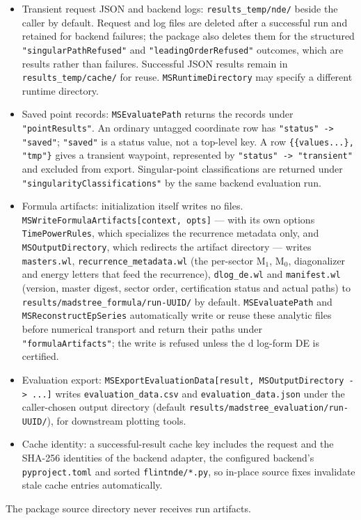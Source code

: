 \documentclass[11pt,a4paper]{article}
\numberwithin{table}{section}
\begin{document}
\begin{itemize}
  \item Transient request JSON and backend logs:
        \texttt{results\_temp/\allowbreak nde/} beside the caller by default.
        Request and log files are deleted after a successful run and retained for backend
        failures; the package also deletes them for the structured \texttt{"singularPathRefused"}
        and \texttt{"leadingOrderRefused"} outcomes, which are results rather than failures.
        Successful JSON results remain in \texttt{results\_temp/\allowbreak cache/} for reuse.
        \texttt{MSRuntimeDirectory} may specify a different runtime directory.
  \item Saved point records: \texttt{MSEvaluatePath} returns the records under
        \texttt{"pointResults"}. An ordinary untagged coordinate row has
        \texttt{"status" -> "saved"}; \texttt{"saved"} is a status value, not a top-level key.
        A row \texttt{\{\{values...\}, "tmp"\}} gives a transient waypoint, represented by
        \texttt{"status" -> "transient"} and excluded from export.
        Singular-point classifications are returned under \texttt{"singularityClassifications"}
        by the same backend evaluation run.
  \item Formula artifacts: initialization itself writes no files.
        \texttt{MSWriteFormulaArtifacts[context, opts]} --- with its own options
        \texttt{TimePowerRules}, which specializes the recurrence metadata only, and
        \texttt{MSOutputDirectory}, which redirects the artifact directory --- writes
        \texttt{masters.wl},
        \texttt{recurrence\_metadata.wl} (the per-sector $\text{M}_1$, $\text{M}_0$, diagonalizer
        and energy letters that feed the recurrence),
        \texttt{dlog\_de.wl} and \texttt{manifest.wl} (version, master digest, sector order,
        certification status and actual paths) to
        \texttt{results/\allowbreak madstree\_formula/\allowbreak run-UUID/} by default.
        \texttt{MSEvaluatePath} and \texttt{MSReconstructEpSeries} automatically write or reuse
        these analytic files before numerical transport and return their paths under
        \texttt{"formulaArtifacts"}; the write is refused unless the d log-form DE is certified.
  \item Evaluation export: \texttt{MSExportEvaluationData[result, MSOutputDirectory -> ...]} writes
        \texttt{evaluation\_data.csv} and \texttt{evaluation\_data.json} under
        the caller-chosen output directory (default
        \texttt{results/\allowbreak madstree\_evaluation/\allowbreak run-UUID/}), for downstream
        plotting tools.
  \item Cache identity: a successful-result cache key includes the request and the SHA-256
        identities of the backend adapter, the configured backend's \texttt{pyproject.toml}
        and sorted \texttt{flintnde/*.py}, so
        in-place source fixes invalidate stale cache entries automatically.
\end{itemize}
The package source directory never receives run artifacts.
\end{document}
